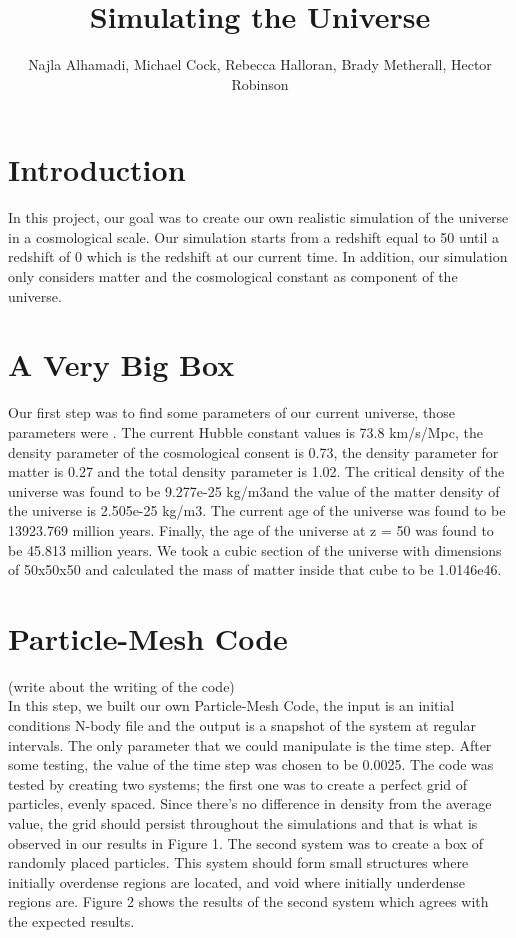 \documentclass[10pt]{article}
\title{Simulating the Universe}
\author{Najla Alhamadi, Michael Cock, Rebecca Halloran, Brady Metherall, Hector Robinson}
\begin{document}
\maketitle
\section{Introduction}
	In this project, our goal was to create our own realistic simulation of the universe in a cosmological scale. Our simulation starts from a redshift equal to 50 until a redshift of 0 which is the redshift at our current time. In addition, our simulation only considers matter and the cosmological constant as component of the universe. 
\section{A Very Big Box}
	Our first step was to find some parameters of our current universe, those parameters were . The current Hubble constant values is 73.8 km/s/Mpc, the density parameter of the cosmological consent is 0.73, the density parameter for matter is 0.27 and the total density parameter is 1.02. The critical density of the universe was found to be 9.277e-25 kg/m3and the value of the matter density of the universe is 2.505e-25 kg/m3. The current age of the universe was found to be 13923.769 million years. Finally, the age of the universe at z = 50 was found to be 45.813 million years. We took a cubic section of the universe with dimensions of 50x50x50 and calculated the mass of matter inside that cube to be 1.0146e46. 
\section{Particle-Mesh Code}
 (write about the writing of the code) \\
	In this step, we built our own Particle-Mesh Code, the input is an initial conditions N-body file and the output is a snapshot of the system at regular intervals. The only parameter that we could manipulate is the time step. After some testing, the value of the time step was chosen to be 0.0025. The code was tested by creating two systems; the first one was to create a perfect grid of particles, evenly spaced. Since there’s no difference in density from the average value, the grid should persist throughout the simulations and that is what is observed in our results in Figure 1. The second system was to create a box of randomly placed particles. This system should form small structures where initially overdense regions are located, and void where initially underdense regions are. Figure 2 shows the results of the second system which agrees with the expected results.       
\end{document}
